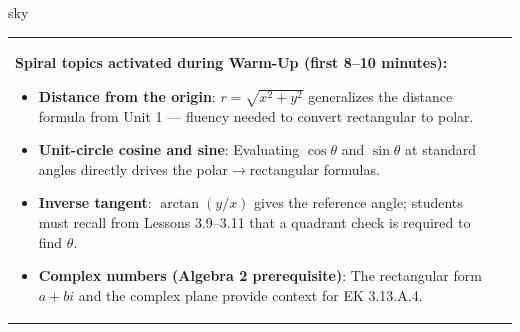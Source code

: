 \documentclass[10pt]{article}
\begin{document}
\begin{skillbox}{sky}
\begin{tabularx}{\linewidth}{@{}X c@{}}
\begin{minipage}[t]{0.96\linewidth}\vspace{0pt}
\textbf{Spiral topics activated during Warm-Up (first 8--10 minutes):}
\begin{itemize}[leftmargin=1.4em, itemsep=2pt]
  \item \textbf{Distance from the origin}: $r = \sqrt{x^2+y^2}$ generalizes
    the distance formula from Unit 1 --- fluency needed to convert rectangular
    to polar.
  \item \textbf{Unit-circle cosine and sine}: Evaluating $\cos\theta$ and
    $\sin\theta$ at standard angles directly drives the polar$\to$rectangular
    formulas.
  \item \textbf{Inverse tangent}: $\arctan(y/x)$ gives the reference angle;
    students must recall from Lessons 3.9--3.11 that a quadrant check is
    required to find $\theta$.
  \item \textbf{Complex numbers (Algebra 2 prerequisite)}: The rectangular form
    $a+bi$ and the complex plane provide context for EK 3.13.A.4.
\end{itemize}
\end{minipage}
&
\end{tabularx}
\end{skillbox}

\vspace{0.08in}
\end{document}
